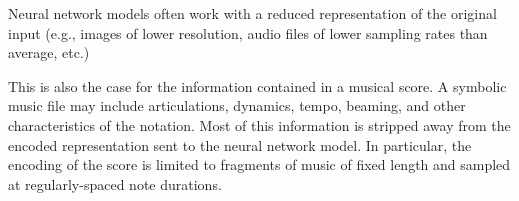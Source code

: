 
Neural network models often work with a reduced
representation of the original input (e.g., images of lower
resolution, audio files of lower sampling rates than
average, etc.)

This is also the case for the information contained in a
musical score. A symbolic music file may include
articulations, dynamics, tempo, beaming, and other
characteristics of the notation. Most of this information is
stripped away from the encoded representation sent to the
neural network model. In particular, the encoding of the
score is limited to fragments of music of fixed length and
sampled at regularly-spaced note durations.
